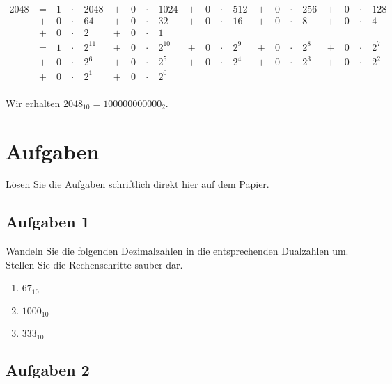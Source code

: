\begin{example}

\begin{align*}
2048 & ~ = ~ & 1 & ~\cdot~ & 2048  & ~ + ~ & 0 & ~\cdot~ & 1024 & ~ + ~ & 0 & ~\cdot~ & 512 & ~ + ~ & 0 & ~\cdot~ & 256 & ~ + ~ & 0 & ~\cdot~ & 128 \\ 
& ~ + ~ & 0 & ~\cdot~ & 64 & ~ + ~ & 0 & ~\cdot~ & 32 & ~ + ~ & 0 & ~\cdot~ & 16 & ~ + ~ & 0 & ~\cdot~ & 8 & ~ + ~ & 0 & ~\cdot~ & 4 \\
& ~ + ~ & 0 & ~\cdot~ & 2 & ~ + ~ & 0 & ~\cdot~ & 1  \\
& ~ = ~ & 1 & ~\cdot~ & 2^{11}  & ~ + ~ & 0 & ~\cdot~ & 2^{10}  & ~ + ~ & 0 & ~\cdot~ & 2^9 & ~ + ~ & 0 & ~\cdot~ & 2^8 & ~ + ~ & 0 & ~\cdot~ & 2^7 \\ 
& ~ + ~ & 0 & ~\cdot~ & 2^6 & ~ + ~ & 0 & ~\cdot~ & 2^5 & ~ + ~ & 0 & ~\cdot~ & 2^4 & ~ + ~ & 0 & ~\cdot~ & 2^3 & ~ + ~ & 0 & ~\cdot~ & 2^2 \\ 
& ~ + ~ & 0 & ~\cdot~ & 2^1 & ~ + ~ & 0 & ~\cdot~ & 2^0  \\
\end{align*}

Wir erhalten $2048_{10} = 100000000000_2$.

\end{example}

\newpage

\section{Aufgaben}

Lösen Sie die Aufgaben schriftlich direkt hier auf dem Papier.

\subsection{Aufgaben 1}
\label{subsection-dualcode-aufgaben-1}

Wandeln Sie die folgenden Dezimalzahlen in die entsprechenden Dualzahlen um. Stellen Sie die Rechenschritte sauber dar.

\begin{enumerate}
\item $67_{10}$
\fillwithgrid{2.5in}
\item $1000_{10}$
\fillwithgrid{2.5in}
\item $333_{10}$
\fillwithgrid{2.5in}
\end{enumerate}

\subsection{Aufgaben 2}
\label{subsection-dualcode-aufgaben-2}

